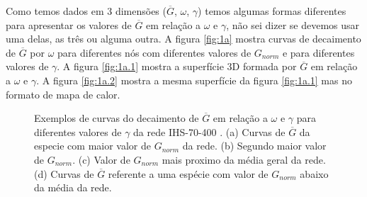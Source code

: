 \documentclass[
  12pt,
]{article}
\begin{document}
Como temos dados em 3 dimensões (\(\overline{G}\), \(\omega\),
\(\gamma\)) temos algumas formas diferentes para apresentar os valores
de \(\overline{G}\) em relação a \(\omega\) e \(\gamma\), não sei dizer
se devemos usar uma delas, as três ou alguma outra. A figura
\ref{fig:1a} mostra curvas de decaimento de \(\overline{G}\) por
\(\omega\) para diferentes nós com diferentes valores de \(G_{norm}\) e
para diferentes valores de \(\gamma\). A figura \ref{fig:1a.1} mostra a
superfície 3D formada por \(\overline{G}\) em relação a \(\omega\) e
\(\gamma\). A figura \ref{fig:1a.2} mostra a mesma superfície da figura
\ref{fig:1a.1} mas no formato de mapa de calor.

\begin{figure}[H]

{\centering {}\newline{}

}

\caption{\label{fig:1a}Exemplos de curvas do decaimento de $\overline{G}$ em relação a $\omega$ e $\gamma$ para diferentes valores de $\gamma$ da rede  IHS-70-400 . (a) Curvas de $\overline{G}$ da especie com maior valor de $G_{norm}$ da rede. (b) Segundo maior valor de $G_{norm}$. (c) Valor de $G_{norm}$ mais proximo da média geral da rede. (d) Curvas de $\overline{G}$ referente a uma espécie com valor de $G_{norm}$ abaixo da média da rede.}\label{fig:decaimentos_ilustrativos}
\end{figure}
\end{document}
